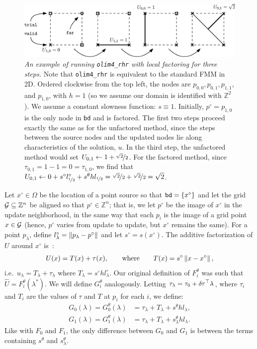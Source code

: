 \documentclass{article}
\begin{document}
\begin{figure}
  \centering
  \includegraphics[width=\linewidth]{factoring-example.eps}
  \caption{\emph{An example of running \texttt{olim4\_rhr} with local
      factoring for three steps.} Note that \texttt{olim4\_rhr} is
    equivalent to the standard FMM in 2D. Ordered clockwise from the
    top left, the nodes are $p_{0, 0}, p_{0, 1}, p_{1, 1}$, and
    $p_{1, 0}$, with $h = 1$ (so we assume our domain is identified
    with $\mathbb{Z}^2$). We assume a constant slowness function:
    $s \equiv 1$. Initially, $p^\circ = p_{1, 0}$ is the only node in
    \texttt{bd} and is factored. The first two steps proceed exactly
    the same as for the unfactored method, since the steps between the
    source nodes and the updated nodes lie along characteristics of
    the solution, $u$. In the third step, the unfactored method would
    set $U_{0,1} \gets 1 + \nicefrac{\sqrt{2}}{2}$. For the factored
    method, since $\tau_{0,1} = 1 - 1 = 0 = \tau_{1,0}$, we find that
    $U_{0,1} \gets 0 + s^\circ l^\circ_{\nicefrac{1}{2}} + s^\theta h
    l_{\nicefrac{1}{2}} = \nicefrac{\sqrt{2}}{2} +
    \nicefrac{\sqrt{2}}{2} = \sqrt{2}$.}\label{fig:factoring-example}
\end{figure}

Let $x^\circ \in \Omega$ be the location of a point source so that
$\texttt{bd} = \left\{x^\circ\right\}$ and let the grid
$\mathcal{G} \subseteq \mathbb{Z}^n$ be aligned so that
$p^\circ \in \mathbb{Z}^n$; that is, we let $p^\circ$ be the image of
$x^\circ$ in the update neighborhood, in the same way that each $p_i$
is the image of a grid point $x \in \mathcal{G}$ (hence, $p^\circ$ varies
from update to update, but $x^\circ$ remains the same). For a point
$p_\lambda$, define $l^\circ_\lambda = \left\|p_\lambda - p^\circ\right\|$ and
let $s^\circ = s(x^\circ)$. The additive factorization of $U$ around
$x^\circ$ is~\cite{luo2012fast,qi2018corner}:
\begin{align}
  U(x) = T(x) + \tau(x), \qquad \text{where} \qquad T(x) = s^\circ \left\|x - x^\circ\right\|,
\end{align}
i.e.\ $u_\lambda = T_\lambda + \tau_\lambda$ where
$T_\lambda = s^\circ h l^\circ_\lambda$. Our original definition of
$F_i^\theta$ was such that $\hat{U} = F_i^\theta(\lambda^*)$. We will
define $G_i^\theta$ analogously. Letting
$\tau_\lambda = \tau_0 + {\delta \hspace{-0.05em} \tau}^\top \lambda$, where $\tau_i$ and
$T_i$ are the values of $\tau$ and $T$ at $p_i$ for each $i$, we
define:
\begin{align}
  \label{eq:Gi}
  G_0(\lambda) = G_0^\theta(\lambda) &= \tau_\lambda + T_\lambda + s^\theta h l_\lambda, \\
  G_1(\lambda) = G_1^\theta(\lambda) &= \tau_\lambda + T_\lambda + s^\theta_\lambda h l_\lambda.
\end{align}
Like with $F_0$ and $F_1$, the only difference between
$G_0$ and $G_1$ is between the terms containing
$s^\theta$ and $s^\theta_\lambda$.
\end{document}
